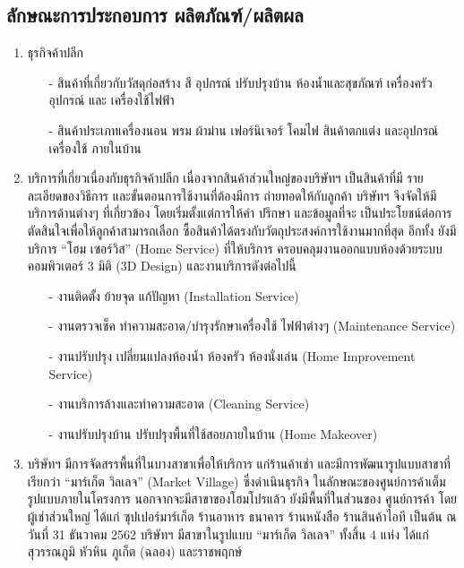     \subsection{ลักษณะการประกอบการ ผลิตภัณฑ์/ผลิตผล}
    \begin{enumerate}
        \item ธุรกิจค้าปลีก
        \begin{itemize}
            \item[-] สินค้าที่เกี่ยวกับวัสดุก่อสร้าง สี อุปกรณ์ ปรับปรุงบ้าน ห้องน้ำและสุขภัณฑ์ เครื่องครัว อุปกรณ์ และ เครื่องใช้ไฟฟ้า
            \item[-] สินค้าประเภทเครื่องนอน พรม ผ้าม่าน เฟอร์นิเจอร์ โคมไฟ สินค้าตกแต่ง และอุปกรณ์เครื่องใช้ ภายในบ้าน  
        \end{itemize}
        \item  บริการที่เกี่ยวเนื่องกับธุรกิจค้าปลีก เนื่องจากสินค้าส่วนใหญ่ของบริษัทฯ เป็นสินค้าที่มี รายละเอียดของวิธีการ และขั้นตอนการใช้งานที่ต้องมีการ ถ่ายทอดให้กับลูกค้า บริษัทฯ จึงจัดให้มีบริการด้านต่างๆ ที่เกี่ยวข้อง โดยเริ่มตั้งแต่การให้คำ ปรึกษา และข้อมูลที่จะ เป็นประโยชน์ต่อการตัดสินใจเพื่อให้ลูกค้าสามารถเลือก ซื้อสินค้าได้ตรงกับวัตถุประสงค์การใช้งานมากที่สุด อีกทั้ง ยังมีบริการ “โฮม เซอร์วิส” (Home Service) ที่ให้บริการ ครอบคลุมงานออกแบบห้องด้วยระบบคอมพิวเตอร์ 3 มิติ (3D Design) และงานบริการดังต่อไปนี้
        \begin{itemize}
            \item[-] งานติดตั้ง ย้ายจุด แก้ปัญหา (Installation Service)
            \item[-] งานตรวจเช็ค ทำความสะอาด/บำรุงรักษาเครื่องใช้ ไฟฟ้าต่างๆ (Maintenance Service)
            \item[-] งานปรับปรุง เปลี่ยนแปลงห้องน้ำ ห้องครัว ห้องนั่งเล่น (Home Improvement Service)
            \item[-] งานบริการล้างและทำความสะอาด (Cleaning Service)
            \item[-] งานปรับปรุงบ้าน ปรับปรุงพื้นที่ใช้สอยภายในบ้าน (Home Makeover)    
        \end{itemize}
        \item บริษัทฯ มีการจัดสรรพื้นที่ในบางสาขาเพื่อให้บริการ แก่ร้านค้าเช่า และมีการพัฒนารูปแบบสาขาที่เรียกว่า “มาร์เก็ต วิลเลจ” (Market Village) ซึ่งดำเนินธุรกิจ ในลักษณะของศูนย์การค้าเต็มรูปแบบภายในโครงการ นอกจากจะมีสาขาของโฮมโปรแล้ว ยังมีพื้นที่ในส่วนของ ศูนย์การค้า โดยผู้เช่าส่วนใหญ่ ได้แก่ ซุปเปอร์มาร์เก็ต ร้านอาหาร ธนาคาร ร้านหนังสือ ร้านสินค้าไอที เป็นต้น ณ วันที่ 31 ธันวาคม 2562 บริษัทฯ มีสาขาในรูปแบบ “มาร์เก็ต วิลเลจ” ทั้งสิ้น 4 แห่ง ได้แก่ สุวรรณภูมิ หัวหิน ภูเก็ต (ฉลอง) และราชพฤกษ์
    \end{enumerate}

